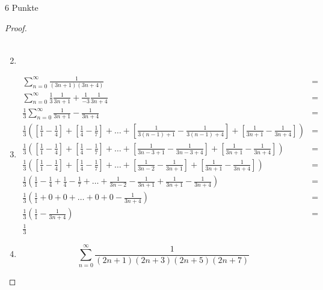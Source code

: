 \documentclass{../problemset}
\begin{document}
\begin{problem}{6 Punkte}
\begin{proof}
\begin{enumerate}
\begin{align}
		      \end{align}
		\item
		\item \begin{align*}
			      \sum_{n=0}^{\infty} \frac{1}{(3n + 1)(3n + 4)}                                                                                                                                                                                 & = \\
			      \sum_{n=0}^{\infty} \frac{1}{3}\frac{1}{3n + 1} + \frac{1}{-3}\frac{1}{3n + 4}                                                                                                                                                 & = \\
			      \frac{1}{3} \sum_{n=0}^{\infty} \frac{1}{3n + 1} - \frac{1}{3n + 4}                                                                                                                                                            & = \\
			      \frac{1}{3} \left(\left[\frac{1}{1} - \frac{1}{4}\right] + \left[\frac{1}{4} - \frac{1}{7}\right] + \ldots + \left[\frac{1}{3(n-1) + 1} - \frac{1}{3(n-1) +4}\right] + \left[\frac{1}{3n + 1} - \frac{1}{3n +4}\right] \right) & = \\
			      \frac{1}{3} \left(\left[\frac{1}{1} - \frac{1}{4}\right] + \left[\frac{1}{4} - \frac{1}{7}\right] + \ldots + \left[\frac{1}{3n -3 + 1} - \frac{1}{3n -3 + 4}\right] + \left[\frac{1}{3n + 1} - \frac{1}{3n +4}\right] \right)  & = \\
			      \frac{1}{3} \left(\left[\frac{1}{1} - \frac{1}{4}\right] + \left[\frac{1}{4} - \frac{1}{7}\right] + \ldots + \left[\frac{1}{3n - 2} - \frac{1}{3n + 1}\right] + \left[\frac{1}{3n + 1} - \frac{1}{3n +4}\right] \right)        & = \\
			      \frac{1}{3} \left(\frac{1}{1} - \frac{1}{4} + \frac{1}{4} - \frac{1}{7} + \ldots + \frac{1}{3n - 2} - \frac{1}{3n + 1} + \frac{1}{3n + 1} - \frac{1}{3n +4} \right)                                                            & = \\
			      \frac{1}{3} \left(\frac{1}{1} + 0 + 0 + \ldots + 0 + 0 - \frac{1}{3n +4} \right)                                                                                                                                               & = \\
			      \frac{1}{3} \left(\frac{1}{1} - \frac{1}{3n +4} \right)                                                                                                                                                                        & = \\
			      \frac{1}{3}
		      \end{align*}
		\item \[
			      \sum_{n=0}^{\infty} \frac{1}{(2n+1)(2n+3)(2n+5)(2n+7)}
		      \]
	\end{enumerate}
\end{proof}
\end{problem}
\end{document}
